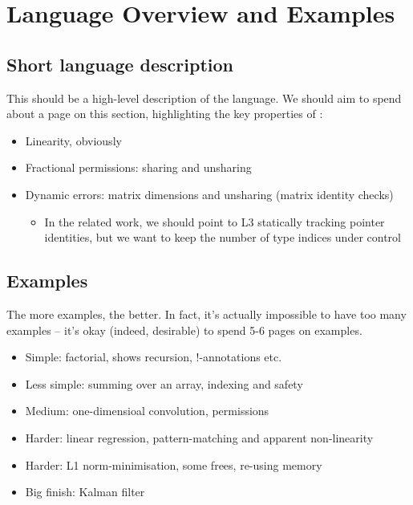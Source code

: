 \section{Language Overview and Examples}

\subsection{Short language description}

This should be a high-level description of the language. We should
aim to spend about a page on this section, highlighting the key
properties of \LANG{}:
\begin{itemize}
\item Linearity, obviously
\item Fractional permissions: sharing and unsharing
\item Dynamic errors: matrix dimensions and unsharing (matrix identity checks)
  \begin{itemize}
  \item In the related work, we should point to L3 statically tracking
    pointer identities, but we want to keep the number of type indices
    under control
  \end{itemize}
\end{itemize}

\subsection{Examples}

The more examples, the better. In fact, it's actually impossible to
have too many examples -- it's okay (indeed, desirable) to spend 5-6
pages on examples.

\begin{itemize}

    \item Simple: factorial, shows recursion, !-annotations etc.

    \item Less simple: summing over an array, indexing and safety

    \item Medium: one-dimensioal convolution, permissions

    \item Harder: linear regression, pattern-matching and apparent non-linearity

    \item Harder: L1 norm-minimisation, some frees, re-using memory

    \item Big finish: Kalman filter

\end{itemize}
